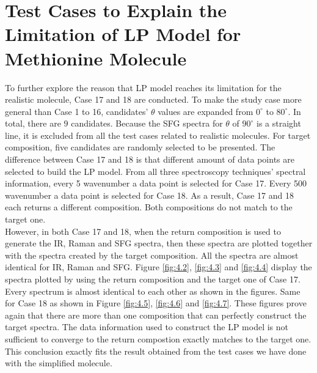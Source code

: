 \section{Test Cases to Explain the Limitation of LP Model for Methionine Molecule}

To further explore the reason that LP model reaches its limitation for the realistic molecule, Case 17 and 18 are conducted. To make the study case more general than Case 1 to 16, candidates' $\theta$ values are expanded from $0^{\circ}$ to $80^{\circ}$. In total, there are $9$ candidates. Because the SFG spectra for $\theta$ of $90^{\circ}$ is a straight line, it is excluded from all the test cases related to realistic molecules. For target composition, five candidates are randomly selected to be presented. The difference between Case 17 and 18 is that different amount of data points are selected to build the LP model. From all three spectroscopy techniques' spectral information, every 5 wavenumber a data point is selected for Case 17. Every 500 wavenumber a data point is selected for Case 18. As a result, Case 17 and 18 each returns a different composition. Both compositions do not match to the target one. \\

However, in both Case 17 and 18, when the return composition is used to generate the IR, Raman and SFG spectra, then these spectra are plotted together with the spectra created by the target composition. All the spectra are almost identical for IR, Raman and SFG. Figure \ref{fig:4.2}, \ref{fig:4.3} and \ref{fig:4.4} display the spectra plotted by using the return composition and the target one of Case 17. Every spectrum is almost identical to each other as shown in the figures. Same for Case 18 as shown in Figure \ref{fig:4.5}, \ref{fig:4.6} and \ref{fig:4.7}. These figures prove again that there are more than one composition that can perfectly construct the target spectra. The data information used to construct the LP model is not sufficient to converge to the return compostion exactly matches to the target one. This conclusion exactly fits the result obtained from the test cases we have done with the simplified molecule.\\

